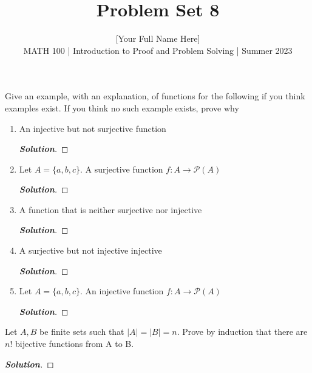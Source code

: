 \documentclass[11pt]{article}
\newenvironment{problem}[2][Problem\!]{\begin{trivlist}
\item[\hskip \labelsep {\bfseries #1}\hskip \labelsep {\bfseries #2.}]}{\end{trivlist}}
\newenvironment{solution}{\begin{proof}[\textbf{\textit{Solution}}]}{\end{proof}}
\begin{document}
 
\title{Problem Set 8}
\author{[Your Full Name Here]\\[0.5em]
MATH 100 | Introduction to Proof and Problem Solving | Summer 2023}
\date{} 
\maketitle


\begin{problem}{8.1}
Give an example, with an explanation, of functions for the following if you think examples exist. If you think no such example exists, prove why \begin{enumerate}
    \item [(a)] An injective but not surjective function
    \begin{solution}
    \end{solution}
    \item [(b)] Let \(A = \{a,b,c\}\). A surjective function \(f: A \to \mathcal{P}(A)\) 
    \begin{solution}
    \end{solution}
    \item [(c)] A function that is neither surjective nor injective 
    \begin{solution}
    \end{solution}
    \item [(d)] A surjective but not injective injective
    \begin{solution}
    \end{solution}
    \item [(e)] Let \(A = \{a,b,c\}\). An injective function \(f: A \to \mathcal{P}(A)\) 
    \begin{solution}
    \end{solution}
\end{enumerate}
\end{problem}

\newpage %


\begin{problem}{8.2}
Let \(A, B \) be finite sets such that \(|A| = |B| = n\). Prove by induction that there are \(n!\) bijective functions from A to B.
\begin{solution}
\end{solution}

\end{problem}
\end{document}
